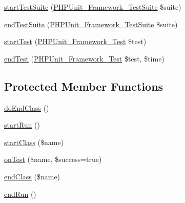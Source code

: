 \begin{DoxyCompactItemize}
\item 
\mbox{\hyperlink{class_p_h_p_unit___util___test_dox___result_printer_a901a86a623d83184267b21f2daee0ff5}{start\+Test\+Suite}} (\mbox{\hyperlink{class_p_h_p_unit___framework___test_suite}{P\+H\+P\+Unit\+\_\+\+Framework\+\_\+\+Test\+Suite}} \$suite)
\item 
\mbox{\hyperlink{class_p_h_p_unit___util___test_dox___result_printer_aeec28a4d1328434916ebcdc1ca6b5527}{end\+Test\+Suite}} (\mbox{\hyperlink{class_p_h_p_unit___framework___test_suite}{P\+H\+P\+Unit\+\_\+\+Framework\+\_\+\+Test\+Suite}} \$suite)
\item 
\mbox{\hyperlink{class_p_h_p_unit___util___test_dox___result_printer_a1a9bddc54f26bb3fb5c2ec9778ea5198}{start\+Test}} (\mbox{\hyperlink{interface_p_h_p_unit___framework___test}{P\+H\+P\+Unit\+\_\+\+Framework\+\_\+\+Test}} \$test)
\item 
\mbox{\hyperlink{class_p_h_p_unit___util___test_dox___result_printer_a6de65eea8b294795cbc34c4c8cee8546}{end\+Test}} (\mbox{\hyperlink{interface_p_h_p_unit___framework___test}{P\+H\+P\+Unit\+\_\+\+Framework\+\_\+\+Test}} \$test, \$time)
\end{DoxyCompactItemize}
\subsection*{Protected Member Functions}
\begin{DoxyCompactItemize}
\item 
\mbox{\hyperlink{class_p_h_p_unit___util___test_dox___result_printer_a2c9315127906ba2144bb7fff833ce6b2}{do\+End\+Class}} ()
\item 
\mbox{\hyperlink{class_p_h_p_unit___util___test_dox___result_printer_abed24f32f95c38cdce0c4b84db2f6888}{start\+Run}} ()
\item 
\mbox{\hyperlink{class_p_h_p_unit___util___test_dox___result_printer_a646956a1369c611cc5cad829c44ac03f}{start\+Class}} (\$name)
\item 
\mbox{\hyperlink{class_p_h_p_unit___util___test_dox___result_printer_a723ae879488ca3d36ebf29c09a4e01dc}{on\+Test}} (\$name, \$success=true)
\item 
\mbox{\hyperlink{class_p_h_p_unit___util___test_dox___result_printer_aa11acea793bf8d2730e17dc210be5d3d}{end\+Class}} (\$name)
\item 
\mbox{\hyperlink{class_p_h_p_unit___util___test_dox___result_printer_a39a423505faaaee7e10ab3e160ea3217}{end\+Run}} ()
\end{DoxyCompactItemize}
